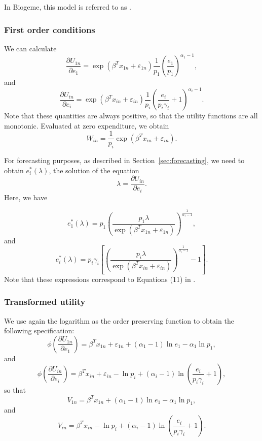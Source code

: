 \documentclass[12pt,a4paper]{article}
\begin{document}
In Biogeme, this model is referred to as \lstinline@generalized@.
\subsubsection*{First order conditions}

We can calculate
\begin{equation}
\frac{\partial U_{1n}}{\partial e_1} =\exp(\beta^T x_{1n} + \varepsilon_{1n}) \frac{1}{p_1} \left(\frac{e_1}{p_1}\right)^{\alpha_1-1},
\end{equation}
and
\begin{equation}
  \frac{\partial U_{in}}{\partial e_i} = \exp(\beta^T x_{in} + \varepsilon_{in}) \frac{1}{p_i} \left(\frac{e_i}{p_i \gamma_i}+1\right)^{\alpha_i-1}.
\end{equation}
Note that these quantities are always positive, so that the utility functions are all monotonic.
Evaluated at zero expenditure, we obtain
\[
    W_{in} =  \frac{1}{p_i} \exp(\beta^T x_{in} + \varepsilon_{in}).
\]

For forecasting purposes, as described in Section~\ref{sec:forecasting}, we need to obtain $e_i^*(\lambda)$, the solution of the equation
\[\lambda = \frac{\partial U_{in}}{\partial e_i}. \]
Here, we have

\begin{equation}
    \label{eq:generalized_optimal_outside}
  e_1^*(\lambda) = p_1\left(\frac{p_1\lambda}{\exp(\beta^T x_{1n} + \varepsilon_{1n})}\right)^{\frac{1}{\alpha_1-1}},
\end{equation}
and
\begin{equation}
    \label{eq:generalized_optimal}
 e_i^*(\lambda) =  p_i \gamma_i \left[\left(\frac{p_i\lambda}{\exp(\beta^T x_{in} + \varepsilon_{in})}\right)^{\frac{1}{\alpha_i-1}}-1\right].
\end{equation}
Note that these expressions correspond to Equations (11) in .

\subsubsection*{Transformed utility}
We use again the logarithm as the order preserving function to obtain the following specification:
\[
\phi\left(\frac{\partial U_{1n}}{\partial e_1}\right) = \beta^T x_{1n} + \varepsilon_{1n} + (\alpha_1-1) \ln e_1 - \alpha_1 \ln p_1,
\]
and
\[
\phi\left(\frac{\partial U_{in}}{\partial e_i}\right) = \beta^T x_{in} + \varepsilon_{in} - \ln p_i + (\alpha_i-1) \ln \left(\frac{e_i}{p_i \gamma_i}+1\right),
\]
so that
\[
V_{1n} = \beta^T x_{1n} + (\alpha_1-1) \ln e_1 - \alpha_1 \ln p_1,
\]
and
\[
V_{in} = \beta^T x_{in} - \ln p_i + (\alpha_i-1) \ln \left(\frac{e_i}{p_i \gamma_i}+1\right).
\]
\end{document}
